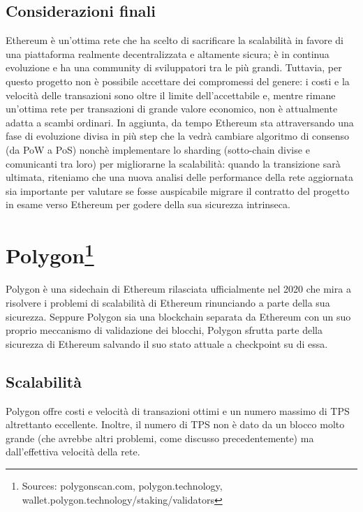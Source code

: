 \documentclass[a4paper, 12pt]{article}
\begin{document}
\newpage
\subsection*{Considerazioni finali}
Ethereum è un'ottima rete che ha scelto di sacrificare la scalabilità in favore di una piattaforma realmente decentralizzata e altamente sicura; è in continua evoluzione
e ha una community di sviluppatori tra le più grandi. Tuttavia, per questo progetto non è possibile accettare dei compromessi del genere: i costi e la velocità delle transazioni
sono oltre il limite dell'accettabile e, mentre rimane un'ottima rete per transazioni di grande valore economico, non è attualmente adatta a scambi ordinari.
In aggiunta, da tempo Ethereum sta attraversando una fase di evoluzione divisa in più step che la vedrà cambiare algoritmo di consenso (da PoW a PoS) nonchè implementare
lo sharding (sotto-chain divise e comunicanti tra loro) per migliorarne la scalabilità: quando la transizione sarà ultimata, riteniamo che una nuova analisi delle performance
della rete aggiornata sia importante per valutare se fosse auspicabile migrare il contratto del progetto in esame verso Ethereum per godere della sua sicurezza intrinseca.

\newpage
\section*{Polygon\footnote{Sources: polygonscan.com, polygon.technology, wallet.polygon.technology/staking/validators}}
Polygon è una sidechain di Ethereum rilasciata ufficialmente nel 2020 che mira a risolvere i problemi di scalabilità di Ethereum rinunciando a parte della sua sicurezza.
Seppure Polygon sia una blockchain separata da Ethereum con un suo proprio meccanismo di validazione dei blocchi, Polygon sfrutta parte della sicurezza di Ethereum salvando il suo stato attuale a checkpoint su di essa.

\subsection*{Scalabilità}
Polygon offre costi e velocità di transazioni ottimi e un numero massimo di TPS altrettanto eccellente.
Inoltre, il numero di TPS non è dato da un blocco molto grande (che avrebbe altri problemi, come discusso precedentemente) ma dall'effettiva velocità della rete.
\end{document}
